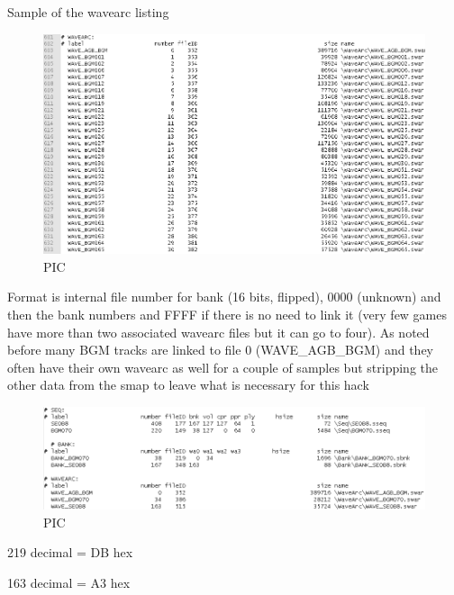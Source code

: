 \documentclass[
]{book}
\begin{document}
Sample of the wavearc listing

\begin{figure}
\centering
\includegraphics{images/148_home_fast6191_romhackingguide_unrenamed_fil___inal_borders_romhackingguidesdatinjection_5.png}
\caption{PIC}
\end{figure}

Format is internal file number for bank (16 bits, flipped), 0000 (unknown) and then the bank numbers and FFFF if there is no need to link it (very few games have more than two associated wavearc files but it can go to four). As noted before many BGM tracks are linked to file 0 (WAVE\_AGB\_BGM) and they often have their own wavearc as well for a couple of samples but stripping the other data from the smap to leave what is necessary for this hack

\begin{figure}
\centering
\includegraphics{images/149_home_fast6191_romhackingguide_unrenamed_fil___inal_borders_romhackingguidesdatinjection_6.png}
\caption{PIC}
\end{figure}

219 decimal = DB hex

163 decimal = A3 hex
\end{document}

